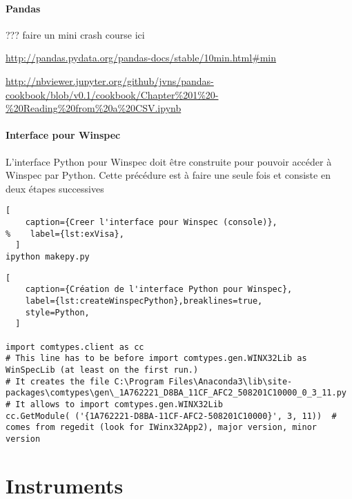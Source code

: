 \documentclass[11pt,francais]{book} %
\begin{document}
\subsubsection{Pandas}

??? faire un mini crash course ici

\url{http://pandas.pydata.org/pandas-docs/stable/10min.html#min}

\url{http://nbviewer.jupyter.org/github/jvns/pandas-cookbook/blob/v0.1/cookbook/Chapter%201%20-%20Reading%20from%20a%20CSV.ipynb}


\subsubsection{Interface pour Winspec}

L'interface Python pour Winspec doit être construite pour pouvoir accéder à Winspec par Python.
Cette précédure est à faire une seule fois et consiste en deux étapes successives

\begin{lstlisting}[
    caption={Creer l'interface pour Winspec (console)},
%    label={lst:exVisa},
  ]
ipython makepy.py 
\end{lstlisting}
                

\begin{lstlisting}[
    caption={Création de l'interface Python pour Winspec},
    label={lst:createWinspecPython},breaklines=true,
    style=Python,
  ]
  
import comtypes.client as cc
# This line has to be before import comtypes.gen.WINX32Lib as WinSpecLib (at least on the first run.)
# It creates the file C:\Program Files\Anaconda3\lib\site-packages\comtypes\gen\_1A762221_D8BA_11CF_AFC2_508201C10000_0_3_11.py
# It allows to import comtypes.gen.WINX32Lib
cc.GetModule( ('{1A762221-D8BA-11CF-AFC2-508201C10000}', 3, 11))  # comes from regedit (look for IWinx32App2), major version, minor version
\end{lstlisting}
                

\chapter{Instruments}

\end{document}
